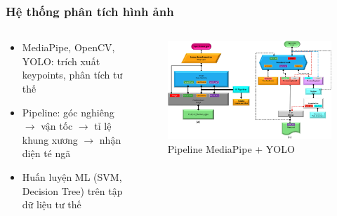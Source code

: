 \begin{frame}
    \frametitle{Hệ thống phân tích hình ảnh}
    \begin{columns}[T]
        \begin{column}{0.48\textwidth}
            \begin{itemize}
                \item MediaPipe, OpenCV, YOLO: trích xuất keypoints, phân tích tư thế
                \item Pipeline: góc nghiêng $\rightarrow$ vận tốc $\rightarrow$ tỉ lệ khung xương $\rightarrow$ nhận diện té ngã
                \item Huấn luyện ML (SVM, Decision Tree) trên tập dữ liệu tư thế
            \end{itemize}
        \end{column}
        \begin{column}{0.48\textwidth}
            \begin{figure}
                \centering
                \includegraphics[width=\textwidth]{images/media_pose_pipeline.png}
                \caption{Pipeline MediaPipe + YOLO}
            \end{figure}
        \end{column}
    \end{columns}
\end{frame}

